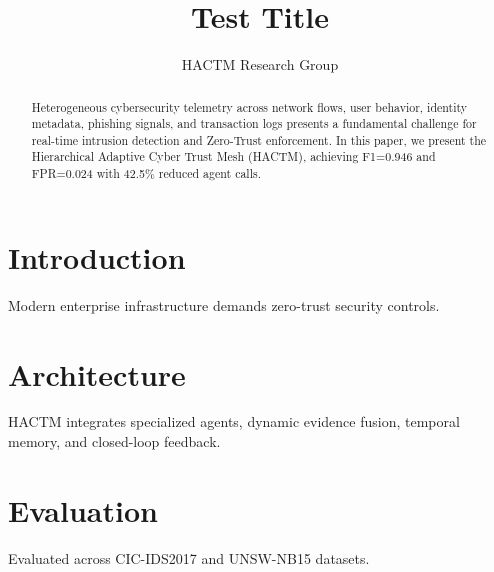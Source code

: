 \documentclass[journal]{IEEEtran}
\title{Test Title}
\author{HACTM Research Group}
\begin{document}
\maketitle

\begin{abstract}
Heterogeneous cybersecurity telemetry across network flows, user behavior, identity metadata, phishing signals, and transaction logs presents a fundamental challenge for real-time intrusion detection and Zero-Trust enforcement. In this paper, we present the Hierarchical Adaptive Cyber Trust Mesh (HACTM), achieving F1=0.946 and FPR=0.024 with 42.5\% reduced agent calls.
\end{abstract}

\section{Introduction}
Modern enterprise infrastructure demands zero-trust security controls.

\section{Architecture}
HACTM integrates specialized agents, dynamic evidence fusion, temporal memory, and closed-loop feedback.

\section{Evaluation}
Evaluated across CIC-IDS2017 and UNSW-NB15 datasets.



\end{document}
